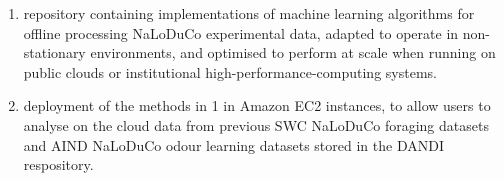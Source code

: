 
\begin{enumerate}

	\item repository containing implementations of machine learning algorithms
	for offline processing NaLoDuCo experimental data, adapted to operate in
	non-stationary environments, and optimised to perform at scale when running
	on public clouds or institutional high-performance-computing systems.

	\item deployment of the methods in 1 in Amazon EC2 instances, to allow
	users to analyse on the cloud data from previous SWC NaLoDuCo foraging
	datasets and AIND NaLoDuCo odour learning datasets stored in the DANDI
	respository.

\end{enumerate}
